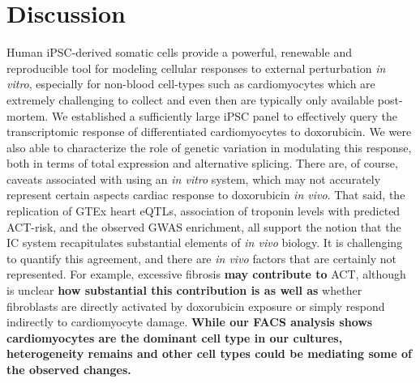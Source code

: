 \documentclass{article}
\newcommand{\tempbold}[1]{\textbf{#1}}
\begin{document}
\section*{Discussion}

Human iPSC-derived somatic cells provide a powerful, renewable and reproducible tool for modeling cellular responses to external perturbation \emph{in vitro}, especially for non-blood cell-types such as cardiomyocytes which are extremely challenging to collect and even then are typically only available post-mortem. 
We established a sufficiently large iPSC panel to effectively query the transcriptomic response of differentiated cardiomyocytes to doxorubicin. We were also able to characterize the role of genetic variation in modulating this response, both in terms of total expression and alternative splicing. 
There are, of course, caveats associated with using an \emph{in vitro} system, which may not accurately represent certain aspects cardiac response to doxorubicin \emph{in vivo}. 
That said, the replication of GTEx heart eQTLs, association of troponin levels with predicted ACT-risk\cite{Burridge2016}, and the observed GWAS enrichment, all support the notion that the IC system recapitulates substantial elements of \emph{in vivo} biology. 
It is challenging to quantify this agreement, and there are \emph{in vivo} factors that are certainly not represented. For example, excessive fibrosis \tempbold{may contribute to} ACT\cite{cascales2013association,zhan2016ataxia,farhad2016characterization,Heck2017-jc}, although is unclear \tempbold{how substantial this contribution is as well as} whether fibroblasts are directly activated by doxorubicin exposure or simply respond indirectly to cardiomyocyte damage. \tempbold{While our FACS analysis shows cardiomyocytes are the dominant cell type in our cultures, heterogeneity remains and other cell types could be mediating some of the observed changes.}
\end{document}
